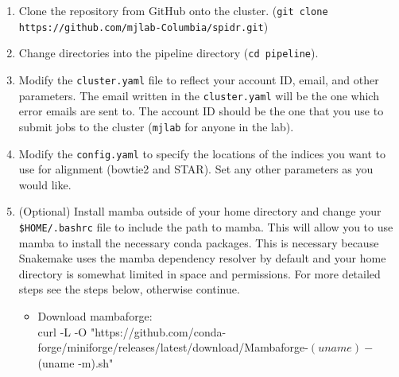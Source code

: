 \documentclass{article}
\begin{document}
    \begin{enumerate}
        \item Clone the repository from GitHub onto the cluster. (\texttt{git clone https://github.com/mjlab-Columbia/spidr.git})
        \item Change directories into the pipeline directory (\texttt{cd pipeline}).
        \item Modify the \texttt{cluster.yaml} file to reflect your account ID, email, and other parameters. The email written in the \texttt{cluster.yaml} will be the one which error emails are sent to. The account ID should be the one that you use to submit jobs to the cluster (\texttt{mjlab} for anyone in the lab).
        \item Modify the \texttt{config.yaml} to specify the locations of the indices you want to use for alignment (bowtie2 and STAR). Set any other parameters as you would like.
        \item (Optional) Install mamba outside of your home directory and change your 
        \texttt{\$HOME/.bashrc} file to include the path to mamba. This will allow you to use mamba to install the necessary conda packages. This is necessary because Snakemake uses the mamba dependency resolver by default and your home directory is somewhat limited in space and permissions. For more detailed steps see the steps below, otherwise continue.
            \begin{itemize}
                \item Download mambaforge: \\
                curl -L -O "https://github.com/conda-forge/miniforge/releases/latest/download/Mambaforge-$(uname)-$(uname -m).sh"
    

\end{itemize}
\end{enumerate}
\end{document}
